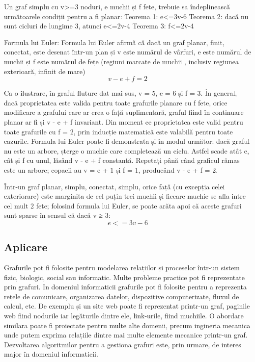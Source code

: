 Un graf simplu  cu v>=3 noduri, e muchii și f fete, trebuie sa îndeplinească următoarele condiții pentru a fi planar:\newline
Teorema 1: e<=3v-6 \newline
Teorema 2: dacă nu sunt cicluri de lungime 3, atunci e<=2v-4 \newline
Teorema 3: f<=2v-4 \newline

Formula lui Euler: \newline
Formula lui Euler afirmă că dacă un graf planar, finit, conectat, este desenat într-un plan și v este numărul de vârfuri, 
e este numărul de muchii și f este numărul de fețe (regiuni marcate de muchii , inclusiv regiunea exterioară, infinit de mare)
\[v-e+f=2\]

Ca o ilustrare, în graful fluture dat mai sus, v = 5, e = 6 și f = 3. În general, dacă proprietatea este valida 
pentru toate grafurile planare cu f fete, orice modificare a grafului care ar crea o față suplimentară, graful 
fiind în continuare planar ar fi și v - e + f invariant. Din moment ce proprietatea este valid pentru toate grafurile 
cu f = 2, prin inducție matematică este valabilă pentru toate cazurile. Formula lui Euler poate fi demonstrata și în 
modul următor: dacă graful nu este un arbore, șterge o muchie care completează un ciclu. Astfel scade atât e, cât și 
f cu unul, lăsând v - e + f constantă. Repetați până când graficul rămas este un arbore; copacii au v = e + 1 și f = 1, 
producând v - e + f = 2.\newline

Într-un graf planar, simplu, conectat, simplu, orice față (cu excepția celei exteriorare) este marginita de cel puțin trei 
muchii și fiecare muchie se afla intre cel mult 2 fete; folosind formula lui Euler, se poate arăta apoi că aceste grafuri  
sunt sparse în sensul că dacă v ≥ 3: 
\[e<=3v-6\]

\subsection{Aplicare}

Grafurile pot fi folosite pentru modelarea relațiilor și proceselor într-un sistem fizic, biologic, 
social sau informatic. Multe probleme practice pot fi reprezentate prin grafuri. In domeniul informaticii 
grafurile pot fi folosite pentru a reprezenta rețele de comunicare, organizarea datelor, dispozitive computerizate, 
fluxul de calcul, etc. De exemplu și un site web poate fi reprezentat printr-un graf, paginile web fiind nodurile 
iar legăturile dintre ele, link-urile, fiind muchiile. O abordare similara poate fi proiectate pentru multe alte domenii, 
precum ingineria mecanica unde putem exprima relațiile dintre mai multe elemente mecanice printr-un graf. Dezvoltarea 
algoritmilor pentru a gestiona grafuri este, prin urmare, de interes major în domeniul informaticii.










